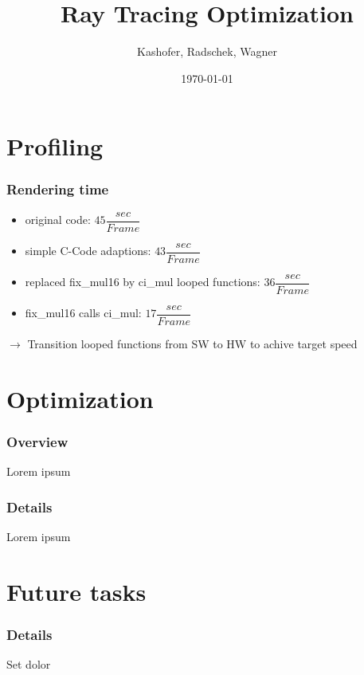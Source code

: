 \documentclass{beamer}
\title{Ray Tracing Optimization}
\author{Kashofer, Radschek, Wagner}
\date{\today}
\begin{document}
\maketitle
\frame{\tableofcontents[currentsection]}
 
\section{Profiling}
\begin{frame} %
	\frametitle{Rendering time} %
  	\begin{itemize}
		\item original code: $45 \dfrac{sec}{Frame}$
		\item simple C-Code adaptions: $43 \dfrac{sec}{Frame}$
		\item replaced fix\_mul16 by ci\_mul looped functions: $36 \dfrac{sec}{Frame}$
		\item fix\_mul16 calls ci\_mul: $17 \dfrac{sec}{Frame}$
	\end{itemize}
	$\quad$\\
	$\rightarrow$ Transition looped functions from SW to HW to achive target speed
\end{frame}

\section{Optimization}
\begin{frame} %
	\frametitle{Overview} %
	Lorem ipsum
\end{frame}

\begin{frame} %
	\frametitle{Details} %
	Lorem ipsum
\end{frame}

\section{Future tasks}
\begin{frame} %
	\frametitle{Details} %
	Set dolor
\end{frame}
\end{document}
